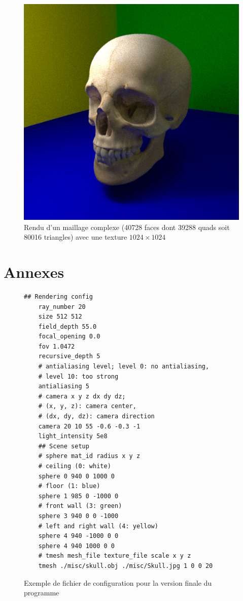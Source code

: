\documentclass[12pt]{article}
\begin{document}
\begin{figure}[ht]
  \centering
  \includegraphics[width=12cm]{../result/step10}
  \caption{Rendu d'un maillage complexe (40728 faces dont 39288 quads soit 80016 triangles) avec une texture $1024\times1024$}\label{fig:step10}
\end{figure}

\clearpage
\section*{Annexes}

\begin{figure}[ht!]
  \begin{lstlisting}[frame=single]
    ## Rendering config
    ray_number 20
    size 512 512
    field_depth 55.0
    focal_opening 0.0
    fov 1.0472
    recursive_depth 5
    # antialiasing level; level 0: no antialiasing,
    # level 10: too strong
    antialiasing 5
    # camera x y z dx dy dz;
    # (x, y, z): camera center,
    # (dx, dy, dz): camera direction
    camera 20 10 55 -0.6 -0.3 -1
    light_intensity 5e8
    ## Scene setup
    # sphere mat_id radius x y z
    # ceiling (0: white)
    sphere 0 940 0 1000 0
    # floor (1: blue)
    sphere 1 985 0 -1000 0
    # front wall (3: green)
    sphere 3 940 0 0 -1000
    # left and right wall (4: yellow)
    sphere 4 940 -1000 0 0
    sphere 4 940 1000 0 0
    # tmesh mesh_file texture_file scale x y z
    tmesh ./misc/skull.obj ./misc/Skull.jpg 1 0 0 20
  \end{lstlisting}
  \caption{Exemple de fichier de configuration pour la version finale du programme}\label{code:config}
\end{figure}
\end{document}
